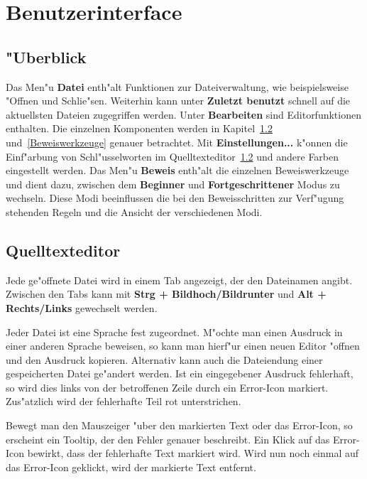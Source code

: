 
\chapter{Benutzerinterface}

\section{"Uberblick} 

Das Men"u {\bf Datei} enth"alt Funktionen zur Dateiverwaltung, wie
beispielsweise "Offnen und Schlie"sen. Weiterhin kann unter {\bf
Zuletzt benutzt} schnell auf die aktuellsten Dateien zugegriffen
werden. Unter {\bf Bearbeiten} sind Editorfunktionen enthalten. Die
einzelnen Komponenten werden in Kapitel~\ref{Qelltexteditor}
und~\ref{Beweiswerkzeuge} genauer betrachtet. Mit {\bf
Einstellungen...} k"onnen die
Einf"arbung von Schl"usselworten im
Quelltexteditor~\ref{Qelltexteditor} und andere Farben eingestellt werden. Das Men"u {\bf Beweis}
enth"alt die einzelnen Beweiswerkzeuge und dient dazu, zwischen dem
{\bf Beginner} und {\bf Fortgeschrittener} Modus zu wechseln. Diese
Modi beeinflussen die bei den Beweisschritten zur Verf"ugung
stehenden Regeln und die Ansicht der verschiedenen Modi. 

\section {Quelltexteditor}
\label{Qelltexteditor} Jede ge"offnete Datei wird in einem Tab
angezeigt, der den Dateinamen angibt. Zwischen den Tabs kann mit
{\bf Strg + Bildhoch/Bildrunter} und {\bf Alt + Rechts/Links}
gewechselt werden.

Jeder Datei ist eine Sprache fest zugeordnet. M"ochte man einen
Ausdruck in einer anderen Sprache beweisen, so kann man hierf"ur
einen neuen Editor "offnen und den Ausdruck kopieren. Alternativ
kann auch die Dateiendung einer gespeicherten Datei ge"andert
werden. Ist ein eingegebener Ausdruck fehlerhaft, so wird dies links
von der betroffenen Zeile durch ein Error-Icon markiert. Zus"atzlich 
wird der fehlerhafte Teil rot unterstrichen. 

Bewegt man den Mauszeiger "uber den markierten Text oder das Error-Icon,
so erscheint ein Tooltip, der den Fehler genauer beschreibt. Ein Klick
auf das Error-Icon bewirkt, dass der fehlerhafte Text markiert wird. Wird
nun noch einmal auf das Error-Icon geklickt, wird der markierte Text
entfernt.

